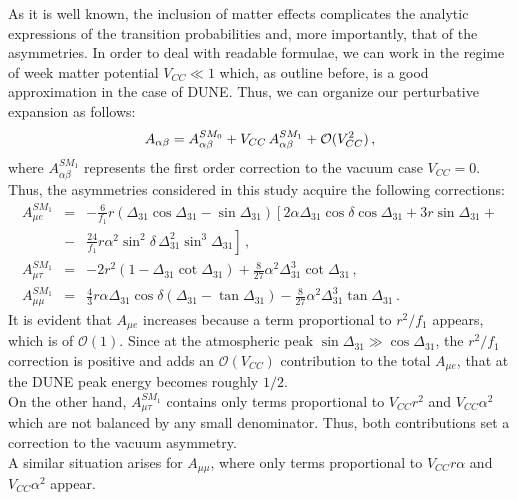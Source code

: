 \documentclass[12pt]{article}
\begin{document}
As it is well known, the inclusion of matter effects complicates the analytic expressions of the transition probabilities and, more importantly, that of the asymmetries. In order to deal with readable formulae, we can work in the regime of week matter potential $V_{CC} \ll 1$ which, as outline before, is a good approximation in the case of DUNE. Thus, we can organize our perturbative expansion as follows: 
\begin{equation}\label{orgpert}
A_{\alpha\beta} =A_{\alpha\beta}^{SM_0} +V_{CC} \, A_{\alpha\beta}^{SM_1} + {\cal O}(V_{CC}^2) \,,
\end{equation}
where $A_{\alpha\beta}^{SM_1}$ represents the first order correction to  the vacuum case $V_{CC} =0$. Thus, the asymmetries considered in this study acquire the following corrections:
\begin{eqnarray}\nonumber
A_{\mu e}^{SM_1} &=&-\frac{6}{f_1} r \nonumber
\left(\Delta_{31} \cos \Delta_{31}-\sin \Delta_{31}\right)\left[2\alpha\Delta_{31}\cos\delta\cos\Delta_{31}+3 r \sin\Delta_{31}+\right. \\&-& \left.   
  \frac{24}{f_1} r \alpha^2\sin^2\delta \,\Delta_{31}^2\sin^3 \Delta_{31}
\right] \,, \\
A_{\mu \tau}^{SM_1} &=& -2 r^2 \left(1-\Delta_{31} \cot\Delta_{31}\right) + \frac{8}{27}\alpha^2\Delta_{31}^3\cot\Delta_{31} \,,\\
\label{amumuSM}
 A_{\mu\mu}^{SM_1} &=& \frac{4}{3}r \alpha \Delta_{31}\cos\delta\left(\Delta_{31}-\tan \Delta_{31}\right)-\frac{8}{27}\alpha^2 \Delta_{31}^3 \tan \Delta_{31}\,.
\end{eqnarray}
It is evident that $A_{\mu e}$ increases because a term proportional to $r^2/f_1$ appears, which is of $\mathcal{O}(1)$. Since at the atmospheric peak $\sin{\Delta_{31}}\gg \cos{\Delta_{31}}$, the $r^2/f_1$ correction is positive and adds an $\mathcal{O}(V_{CC})$ contribution to the total $A_{\mu e}$, that at the DUNE peak energy becomes roughly $1/2$. \\
On the other hand, $A_{\mu \tau}^{SM_1}$ contains only terms proportional to $V_{CC} r^2$ and $V_{CC} \alpha^2$ which are not balanced by any small denominator. Thus, both contributions set a correction to the vacuum asymmetry. \\
A similar situation arises for $A_{\mu\mu}$, where only terms proportional to $V_{CC} r \alpha$ and $V_{CC} \alpha^2$ appear. %
\end{document}
